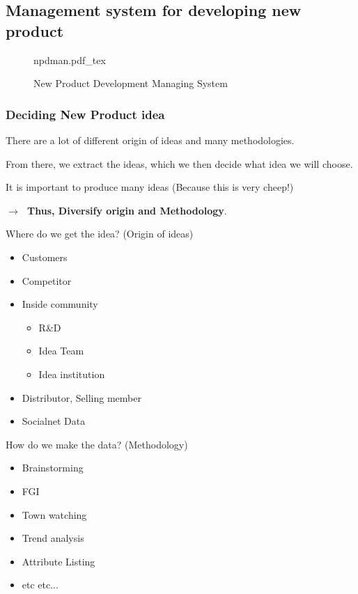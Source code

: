\documentclass[12pt]{article}
\newcommand{\ra}{$\rightarrow \text{ }$}
\newcommand{\nii}{\noindent}
\begin{document}
\subsection{Management system for developing new product}

\begin{figure}[H]
	\centering
	\def\svgwidth{\columnwidth}
	{npdman.pdf_tex}
	\caption{New Product Development Managing System}
	\label{fig:npdman}
\end{figure}

\subsubsection{Deciding New Product idea}

There are a lot of different origin of ideas and many methodologies.

From there, we extract the ideas, which we then decide what idea we will choose.

It is important to produce many ideas (Because this is very cheep!)

\ra \textbf{Thus, Diversify origin and Methodology}.

Where do we get the idea? (Origin of ideas)

\begin{itemize}
	\item Customers
	\item Competitor
	\item Inside community \\
	\begin{itemize}
		\item R\&D
		\item Idea Team
		\item Idea institution
	\end{itemize}
	\item Distributor, Selling member
	\item Socialnet Data
\end{itemize}
\nii
How do we make the data? (Methodology)
\begin{itemize}
	\item Brainstorming
	\item FGI
	\item Town watching
	\item Trend analysis
	\item Attribute Listing
	\item etc etc...
\end{itemize}
\end{document}
